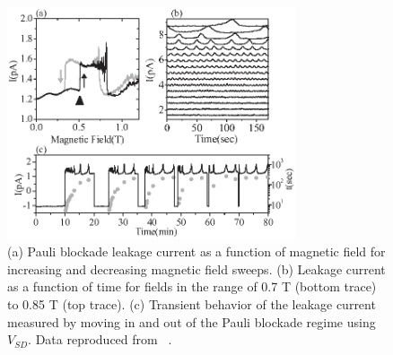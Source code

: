 \documentclass[12pt,aps,nofootinbib]{revtex4-1}
\begin{document}
\begin{figure}[htb]
\includegraphics[width=8.5cm]{hanson_fig36.eps}
\caption{(a) Pauli blockade leakage current as a function of
magnetic field for increasing and decreasing magnetic field
sweeps. (b) Leakage current as a function of time for fields in
the range of 0.7 T (bottom trace) to 0.85 T (top trace). (c)
Transient behavior of the leakage current measured by moving in
and out of the Pauli blockade regime using $V_{SD}$. Data
reproduced from ~\textcite{OnoPRL2004}.} \label{Fig:OnoOsc}
\end{figure}
\end{document}
